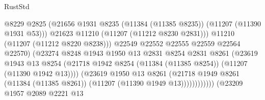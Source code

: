 \begin{lexlean}{RustStd}
\begin{coremodule}
                                              @8229
                                              @2825
                                              (@21656
                                                @1931
                                                @8235
                                                (@11384 (@11385 @8235))
                                                (@11207 (@11390 @1931 @53)))
                                              @21623
                                              @11210
                                              (@11207 (@11212 @8230 @2831)))
                                            @11210
                                            (@11207 (@11212 @8220 @8238)))
                                          @22549
                                          @22552
                                          @22555
                                          @22559
                                          @22564
                                          @22570)
                                        (@23274
                                          @8248
                                          @1943
                                          @1950
                                          @13
                                          @2831
                                          @8254
                                          @2831
                                          @8261
                                          (@23619
                                            @1943
                                            @13
                                            @8254
                                            (@21718
                                              @1942
                                              @8254
                                              (@11384 (@11385 @8254))
                                              (@11207 (@11390 @1942 @13))))
                                          (@23619
                                            @1950
                                            @13
                                            @8261
                                            (@21718
                                              @1949
                                              @8261
                                              (@11384 (@11385 @8261))
                                              (@11207 (@11390 @1949 @13))))))))))))
                          (@23209
                            @1957
                            @2089
                            @2221
                            @13

\end{coremodule}
\end{lexlean}
